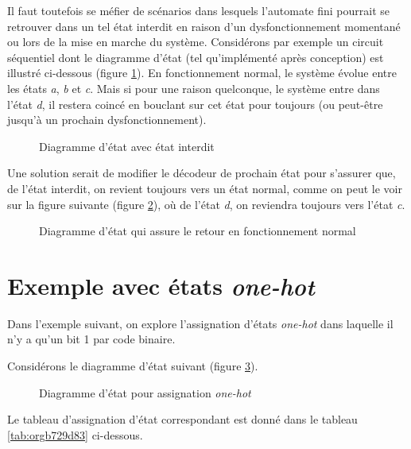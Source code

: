 \documentclass[letter, oneside]{book}
\begin{document}
Il faut toutefois se méfier de scénarios dans lesquels l'automate fini
pourrait se retrouver dans un tel état interdit en raison d'un
dysfonctionnement momentané ou lors de la mise en marche du
système. Considérons par exemple un circuit séquentiel dont le
diagramme d'état (tel qu'implémenté après conception) est illustré
ci-dessous (figure \ref{fig:orge6f45c5}). En fonctionnement normal, le
système évolue entre les états \emph{a}, \emph{b} et \emph{c}. Mais si pour une
raison quelconque, le système entre dans l'état \emph{d}, il restera coincé
en bouclant sur cet état pour toujours (ou peut-être jusqu'à un
prochain dysfonctionnement).

\begin{figure}[htbp]
\centering

\caption{\label{fig:orge6f45c5}Diagramme d'état avec état interdit}
\end{figure}


Une solution serait de modifier le décodeur de prochain état pour
s'assurer que, de l'état interdit, on revient toujours vers un état
normal, comme on peut le voir sur la figure suivante (figure
\ref{fig:org91d148f}), où de l'état \emph{d}, on reviendra toujours
vers l'état \emph{c}. 

\begin{figure}[htbp]
\centering

\caption{\label{fig:org91d148f}Diagramme d'état qui assure le retour en fonctionnement normal}
\end{figure}

\section{Exemple avec états \emph{one-hot}}
\label{sec:orgd24096c}

Dans l'exemple suivant, on explore l'assignation d'états \emph{one-hot}
dans laquelle il n'y a qu'un bit 1 par code binaire.

Considérons le diagramme d'état suivant (figure \ref{fig:org06341a9}).

\begin{figure}[htbp]
\centering

\caption{\label{fig:org06341a9}Diagramme d'état pour assignation \emph{one-hot}}
\end{figure}

Le tableau d'assignation d'état correspondant est donné dans le
tableau \ref{tab:orgb729d83} ci-dessous.
\end{document}
